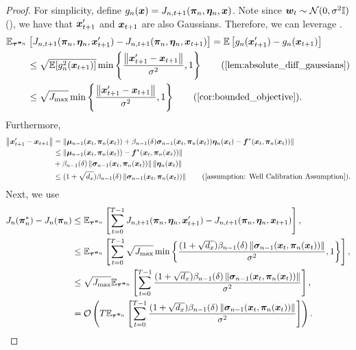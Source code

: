 \begin{proof}
For simplicity, define $g_n({\bm{x}}) = J_{n, t+1}({\bm{\pi}}_n, {\bm{\eta}}_n, {\bm{x}})$.
Note since ${\bm{w}}_t \sim {\mathcal{N}}(0, \sigma^2 \mathbb{I})$ (), we have that ${\bm{x}}'_{t+1}$ and ${\bm{x}}_{t+1}$ are also Gaussians. Therefore, we can leverage .
\begin{align*}
    \E_{\vtau^{\vpi_n}} &\left[J_{n, t+1}(\vpi_n, \veta_n, \vx'_{t+1}) -  J_{n, t+1}(\vpi_n, \veta_n, \vx_{t+1})\right] = \E \left[g_n(\vx'_{t+1}) -  g_n(\vx_{t+1})\right] \\
    &\le  \sqrt{\E[g_n^2(\vx_{t+1})]} \min\left\{ \frac{\norm{\vx'_{t+1} - \vx_{t+1}}}{\sigma^2}, 1 \right\} \tag{\Cref{lem:absolute_diff_gaussians}} \\
   &\le \sqrt{J_{\max}} \min\left\{ \frac{\norm{\vx'_{t+1} - \vx_{t+1}}}{\sigma^2}, 1 \right\} \tag{\Cref{cor:bounded_objective}}.
\end{align*}
Furthermore, 
\begin{align*}
    \norm{\vx'_{t+1} - \vx_{t+1}} &= \norm{\vmu_{n-1}(\vx_t, \vpi_n(\vx_t)) + \beta_{n-1}(\delta)\vsigma_{n-1}(\vx_t, \vpi_n(\vx_t)) \veta_n(\vx_t) - \vf^*(\vx_t, \vpi_n(\vx_t))} \\
    &\le \norm{\vmu_{n-1}(\vx_t, \vpi_n(\vx_t)) - \vf^*(\vx_t, \vpi_n(\vx_t))} \\
    &+ \beta_{n-1}(\delta) \norm{\vsigma_{n-1}(\vx_t, \vpi_n(\vx_t))}\norm{\veta_n(\vx_t)} \\
    &\le (1 + \sqrt{d_x}) \beta_{n-1}(\delta) \norm{\vsigma_{n-1}(\vx_t, \vpi_n(\vx_t))} \tag{\Cref{assumption: Well Calibration Assumption}}.
\end{align*}
Next, we use  
\begin{align*}
   J_n({\bm{\pi}}_n^*) - J_n({\bm{\pi}}_n)  &\leq  \mathbb{E}_{{\bm{\tau}}^{{\bm{\pi}}_n}} \left[\sum^{T-1}_{t=0} J_{n, t+1}({\bm{\pi}}_n, {\bm{\eta}}_n, {\bm{x}}'_{t+1}) -  J_{n, t+1}({\bm{\pi}}_n, {\bm{\eta}}_n, {\bm{x}}_{t+1})\right], \\
   &\leq \mathbb{E}_{{\bm{\tau}}^{{\bm{\pi}}_n}} \left[\sum^{T-1}_{t=0} \sqrt{J_{\max}} \min\left\{ \frac{(1 + \sqrt{d_x}) \beta_{n-1}(\delta) \left\lVert{\bm{\sigma}}_{n-1}({\bm{x}}_t, {\bm{\pi}}_n({\bm{x}}_t))\right\rVert}{\sigma^2}, 1 \right\}\right], \\
   &\leq \sqrt{J_{\max}}  \mathbb{E}_{{\bm{\tau}}^{{\bm{\pi}}_n}} \left[\sum^{T-1}_{t=0} \frac{(1 + \sqrt{d_x}) \beta_{n-1}(\delta) \left\lVert{\bm{\sigma}}_{n-1}({\bm{x}}_t, {\bm{\pi}}_n({\bm{x}}_t))\right\rVert}{\sigma^2}\right], \\
   &= {\mathcal{O}}\left(T \mathbb{E}_{{\bm{\tau}}^{{\bm{\pi}}_n}} \left[\sum^{T-1}_{t=0} \frac{(1 + \sqrt{d_x}) \beta_{n-1}(\delta) \left\lVert{\bm{\sigma}}_{n-1}({\bm{x}}_t, {\bm{\pi}}_n({\bm{x}}_t))\right\rVert}{\sigma^2}\right]\right).
\end{align*}

\end{proof}



